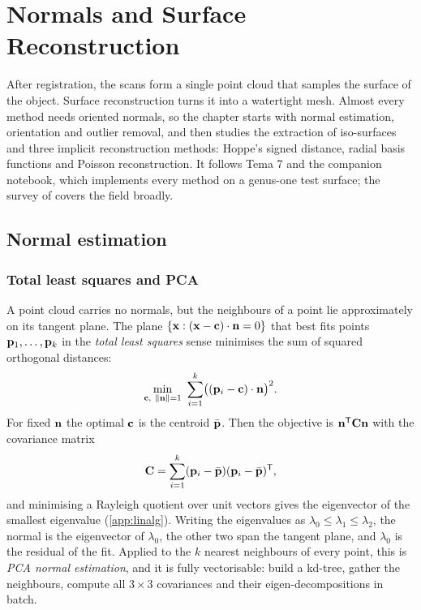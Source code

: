 \chapter{Normals and Surface Reconstruction}\label{ch:recon}

After registration, the scans form a single point cloud that samples the surface of the object.
Surface reconstruction turns it into a watertight mesh. Almost every method needs oriented
normals, so the chapter starts with normal estimation, orientation and outlier removal, and then
studies the extraction of iso-surfaces and three implicit reconstruction methods: Hoppe's signed
distance, radial basis functions and Poisson reconstruction. It follows Tema 7 and the companion
notebook, which implements every method on a genus-one test surface; the survey of
\citet{Berger2017} covers the field broadly.

\section{Normal estimation}

\subsection{Total least squares and PCA}

A point cloud carries no normals, but the neighbours of a point lie approximately on its tangent
plane. The plane $\{\mathbf{x}:(\mathbf{x}-\mathbf{c})\cdot\mathbf{n}=0\}$ that best fits points $\mathbf{p}_1,\dots,\mathbf{p}_k$ in the
\emph{total least squares} sense minimises the sum of squared orthogonal distances:
\begin{equation}
\min_{\bc,\ \norm{\bn}=1}\ \sum_{i=1}^k\bigl((\bp_i-\bc)\cdot\bn\bigr)^2 .
\end{equation}
For fixed $\mathbf{n}$ the optimal $\mathbf{c}$ is the centroid $\bar{\mathbf{p}}$. Then the objective is
$\mathbf{n}^{\mathsf{T}}\mathbf{C}\mathbf{n}$ with the covariance matrix
\begin{equation}
\mathbf{C}=\sum_{i=1}^k(\mathbf{p}_i-\bar{\mathbf{p}})(\mathbf{p}_i-\bar{\mathbf{p}})^{\mathsf{T}} ,
\end{equation}
and minimising a Rayleigh quotient over unit vectors gives the eigenvector of the smallest
eigenvalue (\cref{app:linalg}). Writing the eigenvalues as $\lambda_0\le\lambda_1\le\lambda_2$, the
normal is the eigenvector of $\lambda_0$, the other two span the tangent plane, and $\lambda_0$ is
the residual of the fit. Applied to the $k$ nearest neighbours of every point, this is
\emph{PCA normal estimation}, and it is fully vectorisable: build a kd-tree, gather the neighbours,
compute all $3\times3$ covariances and their eigen-decompositions in batch.

